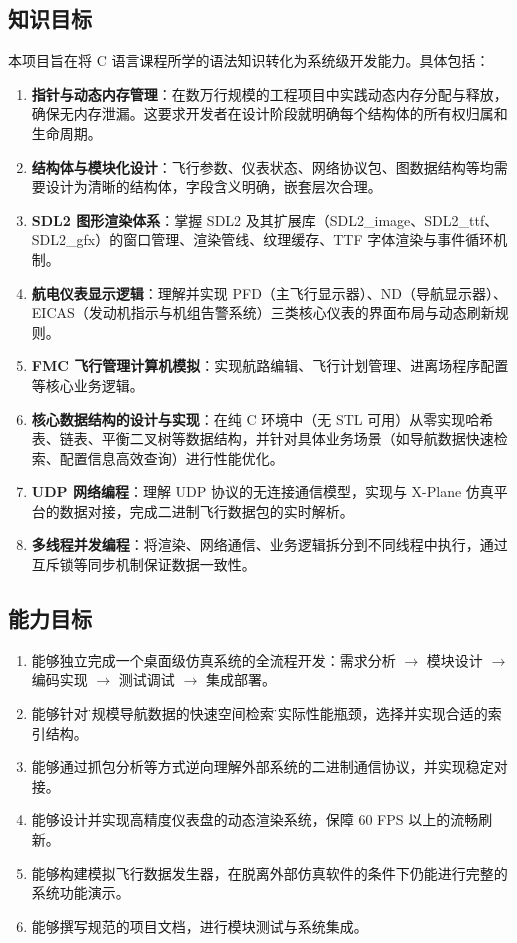 \documentclass[12pt,a4paper]{ctexart}
\begin{document}

\subsection{知识目标}

本项目旨在将 C 语言课程所学的语法知识转化为系统级开发能力。具体包括：

\begin{enumerate}[leftmargin=*]
    \item \textbf{指针与动态内存管理}：在数万行规模的工程项目中实践动态内存分配与释放，确保无内存泄漏。这要求开发者在设计阶段就明确每个结构体的所有权归属和生命周期。
    \item \textbf{结构体与模块化设计}：飞行参数、仪表状态、网络协议包、图数据结构等均需要设计为清晰的结构体，字段含义明确，嵌套层次合理。
    \item \textbf{SDL2 图形渲染体系}：掌握 SDL2 及其扩展库（SDL2\_image、SDL2\_ttf、SDL2\_gfx）的窗口管理、渲染管线、纹理缓存、TTF 字体渲染与事件循环机制。
    \item \textbf{航电仪表显示逻辑}：理解并实现 PFD（主飞行显示器）、ND（导航显示器）、EICAS（发动机指示与机组告警系统）三类核心仪表的界面布局与动态刷新规则。
    \item \textbf{FMC 飞行管理计算机模拟}：实现航路编辑、飞行计划管理、进离场程序配置等核心业务逻辑。
    \item \textbf{核心数据结构的设计与实现}：在纯 C 环境中（无 STL 可用）从零实现哈希表、链表、平衡二叉树等数据结构，并针对具体业务场景（如导航数据快速检索、配置信息高效查询）进行性能优化。
    \item \textbf{UDP 网络编程}：理解 UDP 协议的无连接通信模型，实现与 X-Plane 仿真平台的数据对接，完成二进制飞行数据包的实时解析。
    \item \textbf{多线程并发编程}：将渲染、网络通信、业务逻辑拆分到不同线程中执行，通过互斥锁等同步机制保证数据一致性。
\end{enumerate}

\subsection{能力目标}

\begin{enumerate}[leftmargin=*]
    \item 能够独立完成一个桌面级仿真系统的全流程开发：需求分析 $\rightarrow$ 模块设计 $\rightarrow$ 编码实现 $\rightarrow$ 测试调试 $\rightarrow$ 集成部署。
    \item 能够针对\"大规模导航数据的快速空间检索\"等实际性能瓶颈，选择并实现合适的索引结构。
    \item 能够通过抓包分析等方式逆向理解外部系统的二进制通信协议，并实现稳定对接。
    \item 能够设计并实现高精度仪表盘的动态渲染系统，保障 60 FPS 以上的流畅刷新。
    \item 能够构建模拟飞行数据发生器，在脱离外部仿真软件的条件下仍能进行完整的系统功能演示。
    \item 能够撰写规范的项目文档，进行模块测试与系统集成。
\end{enumerate}
\end{document}
